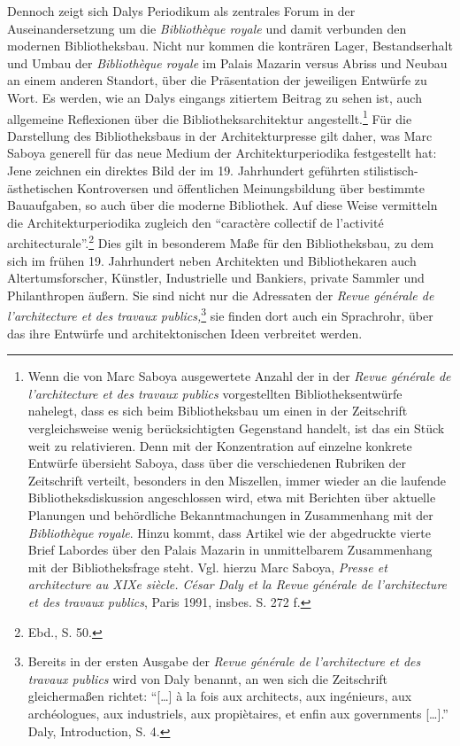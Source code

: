 Dennoch zeigt sich Dalys Periodikum als zentrales Forum in der
Auseinandersetzung um die \emph{Bibliothèque royale} und damit verbunden
den modernen Bibliotheksbau. Nicht nur kommen die konträren Lager,
Bestandserhalt und Umbau der \emph{Bibliothèque royale} im Palais
Mazarin versus Abriss und Neubau an einem anderen Standort, über die
Präsentation der jeweiligen Entwürfe zu Wort. Es werden, wie an Dalys
eingangs zitiertem Beitrag zu sehen ist, auch allgemeine Reflexionen
über die Bibliotheksarchitektur angestellt.\footnote{Wenn die von Marc
  Saboya ausgewertete Anzahl der in der \emph{Revue générale} \emph{de
  l'architecture et des travaux publics} vorgestellten
  Bibliotheksentwürfe nahelegt, dass es sich beim Bibliotheksbau um
  einen in der Zeitschrift vergleichsweise wenig berücksichtigten
  Gegenstand handelt, ist das ein Stück weit zu relativieren. Denn mit
  der Konzentration auf einzelne konkrete Entwürfe übersieht Saboya,
  dass über die verschiedenen Rubriken der Zeitschrift verteilt,
  besonders in den Miszellen, immer wieder an die laufende
  Bibliotheksdiskussion angeschlossen wird, etwa mit Berichten über
  aktuelle Planungen und behördliche Bekanntmachungen in Zusammenhang
  mit der \emph{Bibliothèque royale}. Hinzu kommt, dass Artikel wie der
  abgedruckte vierte Brief Labordes über den Palais Mazarin in
  unmittelbarem Zusammenhang mit der Bibliotheksfrage steht. Vgl. hierzu
  Marc Saboya, \emph{Presse et architecture au XIXe siècle. César Daly
  et la Revue générale de l'architecture et des travaux publics}, Paris
  1991, insbes. S. 272 f.} Für die Darstellung des Bibliotheksbaus in
der Architekturpresse gilt daher, was Marc Saboya generell für das neue
Medium der Architekturperiodika festgestellt hat: Jene zeichnen ein
direktes Bild der im 19. Jahrhundert geführten stilistisch-ästhetischen
Kontroversen und öffentlichen Meinungsbildung über bestimmte
Bauaufgaben, so auch über die moderne Bibliothek. Auf diese Weise
vermitteln die Architekturperiodika zugleich den \enquote{caractère
collectif de l'activité architecturale}.\footnote{Ebd., S. 50.} Dies
gilt in besonderem Maße für den Bibliotheksbau, zu dem sich im frühen
19. Jahrhundert neben Architekten und Bibliothekaren auch
Altertumsforscher, Künstler, Industrielle und Bankiers, private Sammler
und Philanthropen äußern. Sie sind nicht nur die Adressaten der
\emph{Revue générale de l'architecture et des travaux
publics,}\footnote{Bereits in der ersten Ausgabe der \emph{Revue
  générale de l'architecture et des travaux publics} wird von Daly
  benannt, an wen sich die Zeitschrift gleichermaßen richtet:
  \enquote{{[}\ldots{}{]} à la fois aux architects, aux ingénieurs, aux
  archéologues, aux industriels, aux propiètaires, et enfin aux
  governments {[}\ldots{}{]}.} Daly, Introduction, S. 4.} sie finden
dort auch ein Sprachrohr, über das ihre Entwürfe und architektonischen
Ideen verbreitet werden.


